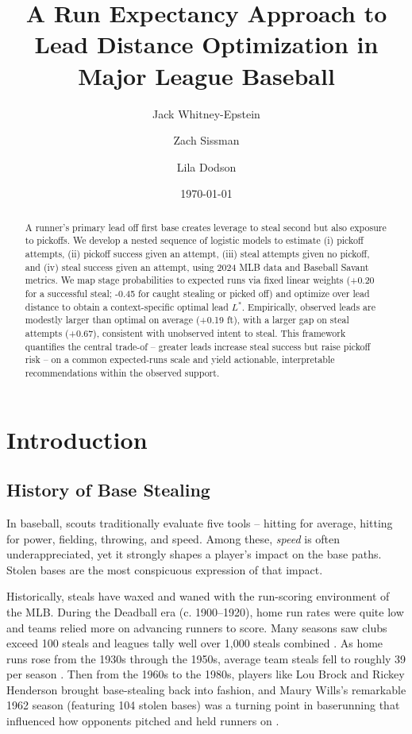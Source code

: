 \documentclass[12pt,letterpaper]{article}
\title{A Run Expectancy Approach to Lead Distance Optimization in Major League Baseball}
\author[1]{Jack Whitney-Epstein}
\author[2]{Zach Sissman}
\author[3]{Lila Dodson}
\affil[1]{\small The Brunswick School, Greenwich, CT}
\affil[2]{\small Community School of Naples, Naples, FL}
\affil[3]{\small San Francisco University High School, San Francisco, CA}
\date{\today}
\begin{document}
\maketitle

\begin{abstract}
    A runner's primary lead off first base creates leverage to steal second but also exposure to pickoffs. We develop a nested sequence of logistic models to estimate (i) pickoff attempts, (ii) pickoff success given an attempt, (iii) steal attempts given no pickoff, and (iv) steal success given an attempt, using 2024 MLB data and Baseball Savant metrics. We map stage probabilities to expected runs via fixed linear weights (+0.20 for a successful steal; -0.45 for caught stealing or picked off) and optimize over lead distance to obtain a context-specific optimal lead $L^*$. Empirically, observed leads are modestly larger than optimal on average (+0.19 ft), with a larger gap on steal attempts (+0.67), consistent with unobserved intent to steal. This framework quantifies the central trade-of -- greater leads increase steal success but raise pickoff risk -- on a common expected-runs scale and yield actionable, interpretable recommendations within the observed support.
\end{abstract}

\section{Introduction}

\subsection{History of Base Stealing}

In baseball, scouts traditionally evaluate five tools -- hitting for average, hitting for power, fielding, throwing, and speed. Among these, \emph{speed} is often underappreciated, yet it strongly shapes a player's impact on the base paths. Stolen bases are the most conspicuous expression of that impact.

Historically, steals have waxed and waned with the run-scoring environment of the MLB. During the Deadball era (c. 1900--1920), home run rates were quite low and teams relied more on advancing runners to score. Many seasons saw clubs exceed 100 steals and leagues tally well over 1,000 steals combined \cite{McMurray2015Deadball}. As home runs rose from the 1930s through the 1950s, average team steals fell to roughly 39 per season \cite{BaseballReference1950}. Then from the 1960s to the 1980s, players like Lou Brock and Rickey Henderson brought base-stealing back into fashion, and Maury Wills's remarkable 1962 season (featuring 104 stolen bases) was a turning point in baserunning that influenced how opponents pitched and held runners on \cite{Vazzana2016MauryWills}.
\end{document}
